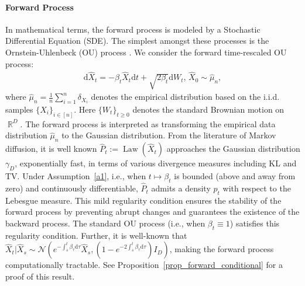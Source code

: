 \documentclass[12pts]{article}
\def\Real{\mathop{\mathbb{R}}\nolimits}
\newcommand{\diff}{\mathrm{d}}
\newcommand{\cN}{ \mathcal{N}}
\newcommand{\hP}{ \hat{P}}
\newcommand{\hX}{ \widehat{X}}
\newcommand{\hmu}{\hat{\mu}}
\newcommand{\hp}{\hat{p}}
\begin{document}
\paragraph{Forward Process} In mathematical terms, the forward process is modeled by a Stochastic Differential Equation (SDE). The simplest amongst these processes is the Ornstein-Uhlenbeck (OU) process \citep{oksendal2003stochastic}. We consider the forward time-rescaled OU process: 
\begin{align}
    \diff  \hX_t = -\beta_t \hX_t \diff  t + \sqrt{2 \beta_t} \diff  W_t, \, \hX_0 \sim \hmu_n, \label{forward}
\end{align}
where $\hmu_n = \frac{1}{n}\sum_{i=1}^n \delta_{X_i}$ denotes the empirical distribution based on the i.i.d. samples $\{X_i\}_{i \in [n]}$. Here $\{W_t\}_{t \ge 0}$ denotes the standard Brownian motion on $\Real^D$. The forward process is interpreted as transforming the empirical data distribution $\hmu_n$ to the Gaussian distribution. From the literature of Markov diffusion, it is well known $\hP_t := \operatorname{Law}(\hX_t)$ approaches the Gaussian distribution $\gamma_D$, exponentially fast, in terms of various divergence measures including KL and TV. Under Assumption~\ref{a1}, i.e., when $t \mapsto \beta_t$ is bounded (above and away from zero) and continuously differentiable, $\hP_t$ admits a density  $\hp_t$ with respect to the Lebesgue measure. This mild regularity condition ensures the stability of the forward process by preventing abrupt changes and guarantees the existence of the backward process. The standard OU process (i.e., when $\beta_t \equiv 1$) satisfies this regularity condition. Further, it is well-known that $\hX_t |\hX_s \sim \cN\left(e^{-\int_s^t \beta_\tau \diff  \tau } \hX_s, (1-e^{- 2\int_s^t \beta_\tau \diff  \tau}) I_D \right)$, making the forward process computationally tractable. See Proposition~\ref{prop_forward_conditional} for a proof of this result.
\end{document}
